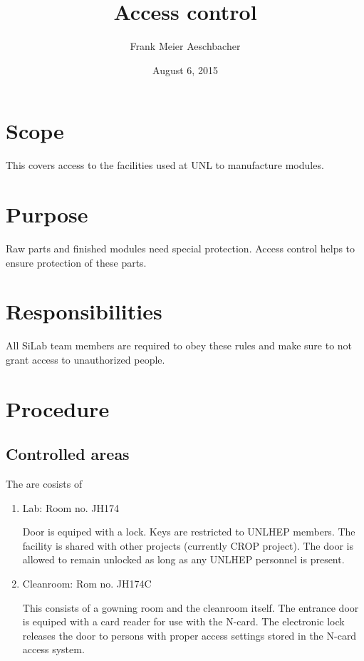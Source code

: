 \documentclass[12pt]{unlsilabsop}
\title{Access control}
\date{August 6, 2015}
\author{Frank Meier Aeschbacher}
\begin{document}
\maketitle

\section{Scope}
This covers access to the facilities used at UNL to manufacture modules.

\section{Purpose}
Raw parts and finished modules need special protection. Access control helps to ensure protection of these parts.


\section{Responsibilities}
All SiLab team members are required to obey these rules and make sure to not grant access to unauthorized people.

\section{Procedure}

\subsection{Controlled areas}
The are cosists of
\begin{enumerate}
    \item Lab: Room no. JH174

    Door is equiped with a lock. Keys are restricted to UNLHEP members. The facility is shared with other projects (currently CROP project). The door is allowed to remain unlocked as long as any UNLHEP personnel is present.
    \item Cleanroom: Rom no. JH174C

    This consists of a gowning room and the cleanroom itself. The entrance door is equiped with a card reader for use with the N-card. The electronic lock releases the door to persons with proper access settings stored in the N-card access system.
\end{enumerate}
\end{document}
